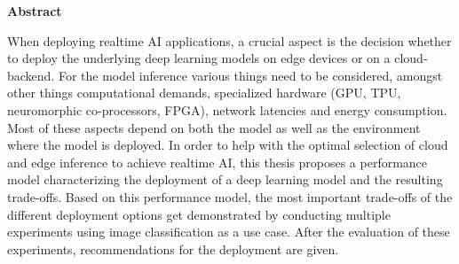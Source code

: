 \vspace*{2cm}

\begin{center}
    \textbf{Abstract}
\end{center}

\vspace*{1cm}


\noindent When deploying realtime AI applications, a crucial aspect is the decision whether to deploy the underlying deep learning models on edge devices or on a cloud-backend.
For the model inference various things need to be considered, amongst other things computational demands,
specialized hardware (GPU, TPU, neuromorphic co-processors, FPGA),
network latencies and energy consumption. Most of these aspects depend on both the model as well as the environment where the model is deployed. 
In order to help with the optimal selection of cloud and edge inference to achieve realtime AI, this thesis proposes a performance model characterizing the deployment of a deep learning model and the resulting trade-offs.
Based on this performance model, the most important trade-offs of the different deployment options get demonstrated by conducting multiple experiments using image classification as a use case. After the evaluation of these experiments, recommendations for the deployment are given.







